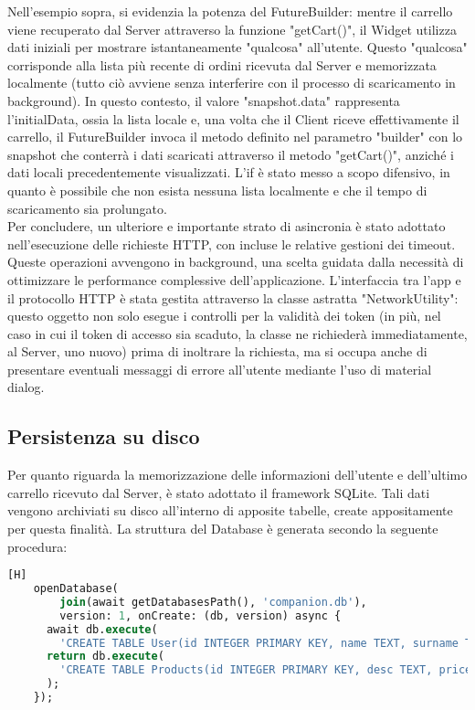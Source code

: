 \noindent
Nell'esempio sopra, si evidenzia la potenza del FutureBuilder: mentre il carrello viene recuperato dal Server attraverso la funzione "getCart()", il Widget utilizza dati iniziali per mostrare istantaneamente "qualcosa" all'utente. Questo "qualcosa" corrisponde alla lista più recente di ordini ricevuta dal Server e memorizzata localmente (tutto ciò avviene senza interferire con il processo di scaricamento in background). In questo contesto, il valore "snapshot.data" rappresenta l'initialData, ossia la lista locale e, una volta che il Client riceve effettivamente il carrello, il FutureBuilder invoca il metodo definito nel parametro "builder" con lo snapshot che conterrà i dati scaricati attraverso il metodo "getCart()", anziché i dati locali precedentemente visualizzati. L'if è stato messo a scopo difensivo, in quanto è possibile che non esista nessuna lista localmente e che il tempo di scaricamento sia prolungato.\\
Per concludere, un ulteriore e importante strato di asincronia è stato adottato nell'esecuzione delle richieste HTTP, con incluse le relative gestioni dei timeout. Queste operazioni avvengono in background, una scelta guidata dalla necessità di ottimizzare le performance complessive dell'applicazione. L'interfaccia tra l'app e il protocollo HTTP è stata gestita attraverso la classe astratta "NetworkUtility": questo oggetto non solo esegue i controlli per la validità dei token (in più, nel caso in cui il token di accesso sia scaduto, la classe ne richiederà immediatamente, al Server, uno nuovo) prima di inoltrare la richiesta, ma si occupa anche di presentare eventuali messaggi di errore all'utente mediante l'uso di material dialog.

\subsection{Persistenza su disco}
Per quanto riguarda la memorizzazione delle informazioni dell'utente e dell'ultimo carrello ricevuto dal Server, è stato adottato il framework SQLite. Tali dati vengono archiviati su disco all'interno di apposite tabelle, create appositamente per questa finalità. La struttura del Database è generata secondo la seguente procedura:
\begin{lstlisting}[language=SQL, style=longBlock, firstnumber=1][H]
    openDatabase(
        join(await getDatabasesPath(), 'companion.db'),
        version: 1, onCreate: (db, version) async {
      await db.execute(
        'CREATE TABLE User(id INTEGER PRIMARY KEY, name TEXT, surname TEXT, creationDate TEXT, username TEXT)');
      return db.execute(
        'CREATE TABLE Products(id INTEGER PRIMARY KEY, desc TEXT, price REAL, quantity INTEGER, imageUrl TEXT)',
      );
    });
\end{lstlisting}

